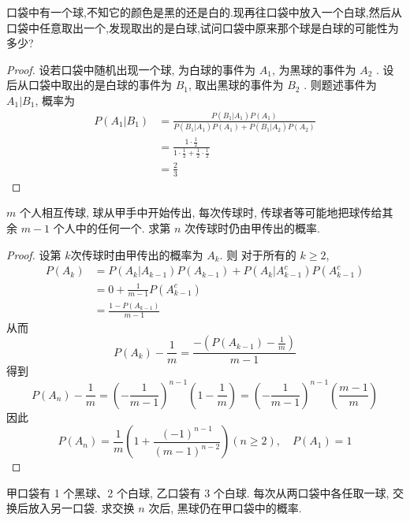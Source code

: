 \documentclass[../main.tex]{subfiles}
\begin{document}
\begin{exercise}{}{}
口袋中有一个球,不知它的颜色是黑的还是白的.现再往口袋中放入一个白球,然后从口袋中任意取出一个,发现取出的是白球,试问口袋中原来那个球是白球的可能性为多少?
\end{exercise}
\begin{proof}
    设若口袋中随机出现一个球, 为白球的事件为 \(  A_1  \), 为黑球的事件为 \(  A_2  \) . 设后从口袋中取出的是白球的事件为 \(  B_1  \), 取出黑球的事件为 \(  B_2  \) . 则题述事件为 \(  A_1|B_1  \), 概率为     \[
   \begin{aligned}
    P\left( A_1|B_1 \right) &= \frac{P\left( B_1|A_1 \right)P\left( A_1 \right)   }{P\left( B_1|A_1 \right)P\left( A_1 \right)+ P\left( B_1|A_2 \right)P\left( A_2 \right)     }  \\ 
     &= \frac{1\cdot \frac{1 }{2 }  }{1\cdot \frac{1 }{2 }+ \frac{1 }{2 }\cdot \frac{1 }{2 }    }\\ 
      &= \frac{2 }{3 }  
   \end{aligned}
    \]
\end{proof}
\begin{exercise}{}{}
$m$ 个人相互传球, 球从甲手中开始传出, 每次传球时, 传球者等可能地把球传给其余 $m-1$ 个人中的任何一个. 求第 $n$ 次传球时仍由甲传出的概率.
\end{exercise}
\begin{proof}
    设第 \(  k  \)次传球时由甲传出的概率为 \(  A_{k}  \). 则 对于所有的 \(  k\ge 2  \), \[
  \begin{aligned}
    P\left( A_{k} \right)&= P\left( A_{k}|A_{k-1} \right)P\left( A_{k-1} \right)+ P\left( A_{k} |A_{k-1}^{c}\right)P\left( A_{k-1}^{c} \right) \\
     &=0+ \frac{1 }{m-1 }P\left( A_{k-1}^{c} \right)\\ 
      &= \frac{1-P\left( A_{k-1} \right)  }{m-1 }   
  \end{aligned}     
    \]从而 \[
    P\left( A_{k} \right)-\frac{1 }{m }= \frac{-\left( P\left( A_{k-1} \right)-\frac{1 }{m }   \right)  }{m-1 }   
    \]得到 \[
    P\left( A_{n} \right)-\frac{1 }{m }= \left( -\frac{1 }{m-1 }  \right)^{n-1}\left( 1-\frac{1 }{m }   \right)= \left( -\frac{1 }{m-1 }  \right)^{n-1}\left( \frac{m-1 }{m }  \right)      
    \]因此 \[
    P\left( A_{n} \right) = \frac{1 }{m }\left( 1+  \frac{\left( -1 \right)^{n-1}  }{\left( m-1 \right)^{n-2}  }  \right) (n\ge 2),\quad P\left( A_1 \right)= 1   
    \]
\end{proof}
\begin{exercise}{}{}
甲口袋有 1 个黑球、2 个白球, 乙口袋有 3 个白球. 每次从两口袋中各任取一球, 交换后放入另一口袋. 求交换 $n$ 次后, 黑球仍在甲口袋中的概率.
\end{exercise}
\end{document}
